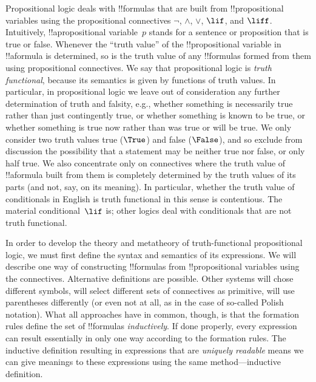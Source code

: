 \documentclass[../../../include/open-logic-section]{subfiles}
\begin{document}


Propositional logic deals with !!{formula}s that are built from
!!{propositional variable}s using the propositional connectives
$\lnot$, $\land$, $\lor$, $\lif$, and $\liff$.  Intuitively,
!!a{propositional variable}~$p$ stands for a sentence or proposition
that is true or false. Whenever the ``truth value'' of the
!!{propositional variable} in !!a{formula} is determined, so is the
truth value of any !!{formula}s formed from them using propositional
connectives.  We say that propositional logic is \emph{truth
  functional}, because its semantics is given by functions of truth
values. In particular, in propositional logic we leave out of
consideration any further determination of truth and falsity, e.g.,
whether something is necessarily true rather than just contingently
true, or whether something is known to be true, or whether something
is true now rather than was true or will be true.  We only consider
two truth values true ($\True$) and false ($\False$), and so exclude
from discussion the possibility that a statement may be neither true
nor false, or only half true. We also concentrate only on connectives where
the truth value of !!a{formula} built from them is completely
determined by the truth values of its parts (and not, say, on its
meaning). In particular, whether the truth value of conditionals in
English is truth functional in this sense is contentious. The material
conditional~$\lif$ is; other logics deal with conditionals that are
not truth functional.

In order to develop the theory and metatheory of truth-functional
propositional logic, we must first define the syntax and semantics of
its expressions.  We will describe one way of constructing
!!{formula}s from !!{propositional variable}s using the
connectives. Alternative definitions are possible. Other systems will
chose different symbols, will select different sets of connectives as
primitive, will use parentheses differently (or even not at all, as in
the case of so-called Polish notation).  What all approaches have in
common, though, is that the formation rules define the set of
!!{formula}s \emph{inductively}. If done properly, every expression
can result essentially in only one way according to the formation
rules.  The inductive definition resulting in expressions that are
\emph{uniquely readable} means we can give meanings to these
expressions using the same method---inductive definition.
\end{document}
